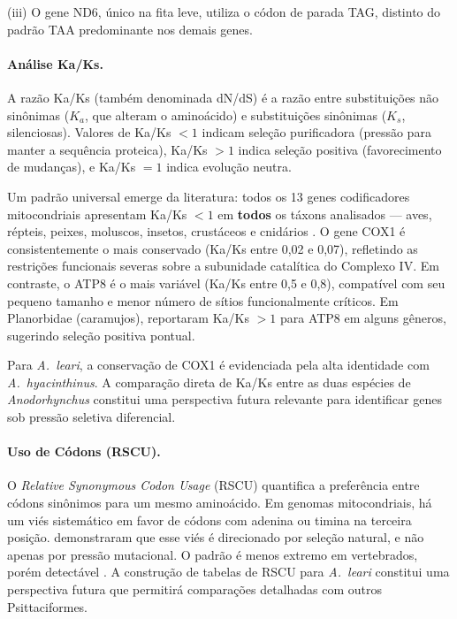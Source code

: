 (iii) O gene ND6, único na fita leve, utiliza o códon de parada TAG, distinto do padrão TAA predominante nos demais genes.

\paragraph*{Análise Ka/Ks.}

A razão Ka/Ks (também denominada dN/dS) é a razão entre substituições não sinônimas ($K_a$, que alteram o aminoácido) e substituições sinônimas ($K_s$, silenciosas). Valores de Ka/Ks $< 1$ indicam seleção purificadora (pressão para manter a sequência proteica), Ka/Ks $> 1$ indica seleção positiva (favorecimento de mudanças), e Ka/Ks $= 1$ indica evolução neutra.

Um padrão universal emerge da literatura: todos os 13 genes codificadores mitocondriais apresentam Ka/Ks $< 1$ em \textbf{todos} os táxons analisados --- aves, répteis, peixes, moluscos, insetos, crustáceos e cnidários \cite{zhan2024,guerreiro2025,shi2024,ye2024,kundu2024,alboasud2024,zhou2024,tao2024}. O gene COX1 é consistentemente o mais conservado (Ka/Ks entre 0,02 e 0,07), refletindo as restrições funcionais severas sobre a subunidade catalítica do Complexo IV. Em contraste, o ATP8 é o mais variável (Ka/Ks entre 0,5 e 0,8), compatível com seu pequeno tamanho e menor número de sítios funcionalmente críticos. Em Planorbidae (caramujos),  reportaram Ka/Ks $> 1$ para ATP8 em alguns gêneros, sugerindo seleção positiva pontual.

Para \textit{A.~leari}, a conservação de COX1 é evidenciada pela alta identidade com \textit{A.~hyacinthinus}. A comparação direta de Ka/Ks entre as duas espécies de \textit{Anodorhynchus} constitui uma perspectiva futura relevante para identificar genes sob pressão seletiva diferencial.

\paragraph*{Uso de Códons (RSCU).}

O \textit{Relative Synonymous Codon Usage} (RSCU) quantifica a preferência entre códons sinônimos para um mesmo aminoácido. Em genomas mitocondriais, há um viés sistemático em favor de códons com adenina ou timina na terceira posição.  demonstraram que esse viés é direcionado por seleção natural, e não apenas por pressão mutacional. O padrão é menos extremo em vertebrados, porém detectável \cite{kundu2024,guerreiro2025}. A construção de tabelas de RSCU para \textit{A.~leari} constitui uma perspectiva futura que permitirá comparações detalhadas com outros Psittaciformes.

